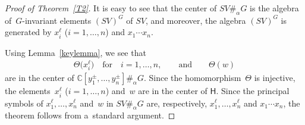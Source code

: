 \begin{proof}[Proof of Theorem~\ref{T2}] It is easy to see that the center of $SV\#_\alpha G$ is the algebra of~$G$-invariant
elements $(SV)^G$ of $SV$, and moreover, the algebra $(SV)^G$ is generated by $x_i^\ell$ ($i=1,\ldots,n$) and $x_1\cdots x_n$.

Using Lemma~\ref{keylemma}, we see that
\begin{gather*}
\Theta\big(x_i^\ell\big)
\quad
\text{for}\quad i=1,\ldots, n,
\qquad
\text{and}
\qquad
\Theta(w)
\end{gather*}
are in the center of ${\mathbb{C}}[y_1^\pm, \ldots, y_n^\pm]\#_\alpha G$.
Since the homomorphism~$\Theta$ is injective, the ele\-ments~$x_i^\ell$ ($i=1,\ldots, n$) and~$w$ are in the center of
$\mathsf{H}$.
Since the principal symbols of $x_1^\ell, \ldots, x_n^\ell$ and~$w$ in $SV\#_\alpha G$ are, respectively, $x_1^\ell,
\ldots, x_n^\ell$ and $x_1\cdots x_n$, the theorem follows from a~standard argument.
\end{proof}
